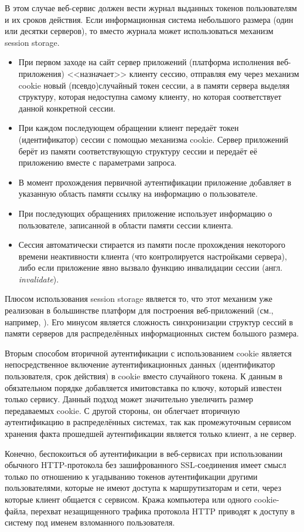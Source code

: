 В этом случае веб-сервис должен вести журнал выданных токенов пользователям и их сроков действия. Если информационная система небольшого размера (один или десятки серверов), то вместо журнала может использоваться механизм session storage.
\begin{itemize}
	\item При первом заходе на сайт сервер приложений (платформа исполнения веб-приложения) <<назначает>> клиенту сессию, отправляя ему через механизм cookie новый (псевдо)случайный токен сессии, а в памяти сервера выделяя структуру, которая недоступна самому клиенту, но которая соответствует данной конкретной сессии.
	\item При каждом последующем обращении клиент передаёт токен (идентификатор) сессии с помощью механизма cookie. Сервер приложений берёт из памяти соответствующую структуру сессии и передаёт её приложению вместе с параметрами запроса.
	\item В момент прохождения первичной аутентификации приложение добавляет в указанную область памяти ссылку на информацию о пользователе.
	\item При последующих обращениях приложение использует информацию о пользователе, записанной в области памяти сессии клиента.
	\item Сессия автоматически стирается из памяти после прохождения некоторого времени неактивности клиента (что контролируется настройками сервера), либо если приложение явно вызвало функцию инвалидации сессии (англ. \textit{invalidate}).
\end{itemize}

Плюсом использования session storage является то, что этот механизм уже реализован в большинстве платформ для построения веб-приложений (см., например, \cite[Controlling sessions]{Brittain:Darwin:2007}). Его минусом является сложность синхронизации структур сессий в памяти серверов для распределённых информационных систем большого размера.

Вторым способом вторичной аутентификации с использованием cookie является непосредственное включение аутентификационных данных (идентификатор пользователя, срок действия) в cookie вместо случайного токена. К данным в обязательном порядке добавляется имитовставка по ключу, который известен только сервису. Данный подход может значительно увеличить размер передаваемых cookie. С другой стороны, он облегчает вторичную аутентификацию в распределённых системах, так как промежуточным сервисом хранения факта прошедшей аутентификации является только клиент, а не сервер.

Конечно, беспокоиться об аутентификации в веб-сервисах при использовании обычного HTTP-протокола без зашифрованного SSL-соединения имеет смысл только по отношению к угадыванию токенов аутентификации другими пользователями, которые не имеют доступа к маршрутизаторам и сети, через которые клиент общается с сервисом. Кража компьютера или одного cookie-файла, перехват незащищенного трафика протокола HTTP приводят к доступу в систему под именем взломанного пользователя.
